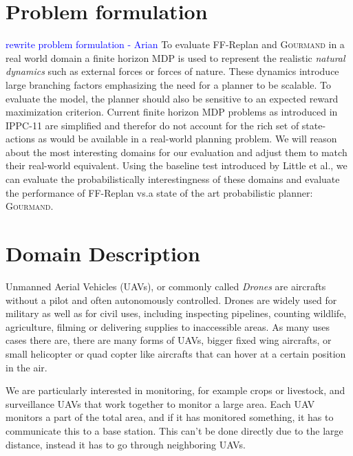 \documentclass[runningheads,a4paper]{llncs}
\newcommand\todo[1]{\textcolor{blue}{#1}}
\begin{document}

\section{Problem formulation}
\label{sec:problem}

\todo{rewrite problem formulation - Arian}
To evaluate FF-Replan and \textsc{Gourmand} in a real world domain a finite horizon MDP is used to represent the realistic \emph{natural dynamics} such as external forces or forces of nature. These dynamics introduce large branching factors emphasizing the need for a planner to be scalable. To evaluate the model, the planner should also be sensitive to an expected reward maximization criterion.
Current finite horizon MDP problems as introduced in IPPC-11 are simplified and therefor do not account for the rich set of state-actions as would be available in a real-world planning problem. We will reason about the most interesting domains for our evaluation and adjust them to match their real-world equivalent. Using the baseline test introduced by Little et al.\@ \cite{little2007probvsreplan}, we can evaluate the probabilistically interestingness of these domains and evaluate the performance of FF-Replan vs.\@ a state of the art probabilistic planner: \textsc{Gourmand}.

\section{Domain Description}
\label{sec:domaind}

Unmanned Aerial Vehicles (UAVs), or commonly called \emph{Drones} are aircrafts
without a pilot and often autonomously controlled. Drones are widely used for
military as well as for civil uses, including inspecting pipelines, counting
wildlife, agriculture, filming or delivering supplies to inaccessible areas.
As many uses cases there are, there are many forms of UAVs, bigger fixed wing
aircrafts, or small helicopter or quad copter like aircrafts that can hover at
a certain position in the air.

We are particularly interested in monitoring, for example crops or livestock,
and surveillance UAVs that work together to monitor a large area. Each UAV
monitors a part of the total area, and if it has monitored something, it has
to communicate this to a base station. This can't be done directly due to the
large distance, instead it has to go through neighboring UAVs.
\end{document}
